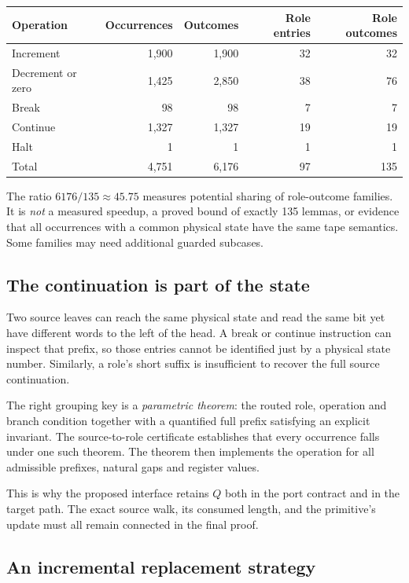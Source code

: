 \documentclass[11pt,letterpaper]{article}
\theoremstyle{definition}\newtheorem{definition}[theorem]{Definition}
\begin{document}
\begin{center}\small
\begin{tabularx}{\textwidth}{@{}Yrrrr@{}}
\toprule
Operation & Occurrences & Outcomes & Role entries & Role outcomes \\
\midrule
Increment & 1,900 & 1,900 & 32 & 32 \\
Decrement or zero & 1,425 & 2,850 & 38 & 76 \\
Break & 98 & 98 & 7 & 7 \\
Continue & 1,327 & 1,327 & 19 & 19 \\
Halt & 1 & 1 & 1 & 1 \\
\midrule
Total & 4,751 & 6,176 & 97 & 135 \\
\bottomrule
\end{tabularx}
\end{center}

The ratio \(6176/135\approx45.75\) measures potential sharing of role-outcome
families. It is \emph{not} a measured speedup, a proved bound of exactly 135
lemmas, or evidence that all occurrences with a common physical state have the
same tape semantics. Some families may need additional guarded subcases.

\subsection{The continuation is part of the state}

Two source leaves can reach the same physical state and read the same bit yet
have different words to the left of the head. A break or continue instruction
can inspect that prefix, so those entries cannot be identified just by a
physical state number. Similarly, a role's short suffix is insufficient to
recover the full source continuation.

The right grouping key is a \emph{parametric theorem}: the routed role,
operation and branch condition together with a quantified full prefix satisfying
an explicit invariant. The source-to-role certificate establishes that every
occurrence falls under one such theorem. The theorem then implements the
operation for all admissible prefixes, natural gaps and register values.

This is why the proposed interface retains \(Q\) both in the port contract
and in the target path. The exact source walk, its consumed length, and the
primitive's update must all remain connected in the final proof.

\subsection{An incremental replacement strategy}
\end{document}
